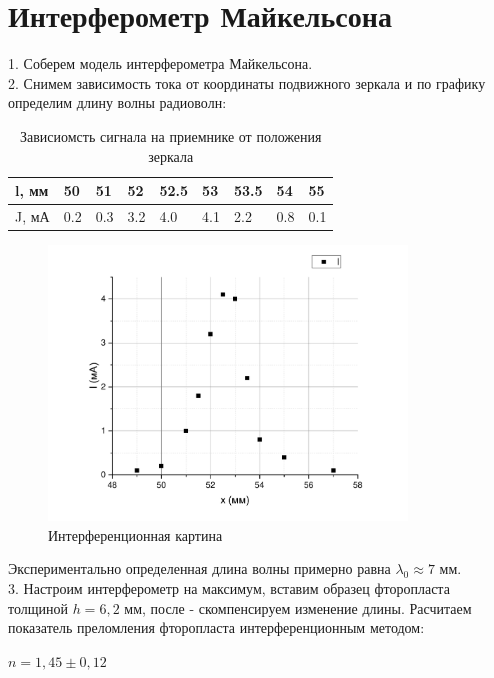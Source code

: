 \documentclass[12pt]{article}
\begin{document}
\section{Интерферометр Майкельсона}
1. Соберем модель интерферометра Майкельсона.\\
2. Снимем зависимость тока от координаты подвижного зеркала и по графику определим длину волны радиоволн:\\
\begin{table}[!h]
\caption{Зависиомсть сигнала на приемнике от положения зеркала}
\begin{center}

\begin{tabular}{|l|l|l|l|l|l|l|l|l|}
\hline
l, мм  & 50 & 51 & 52 & 52.5 & 53 & 53.5 & 54 & 55 \\ \hline
J, мА & 0.2 & 0.3 & 3.2 & 4.0 & 4.1 & 2.2 & 0.8 & 0.1 \\ \hline

\end{tabular}

\end{center}
\end{table}
\begin{figure}[!h]
\begin{center}
\includegraphics[width = 0.85\textwidth]{interf}
\caption{Интерференционная картина}
\end{center}
\end{figure}
Экспериментально определенная длина волны примерно равна $\lambda_0 \approx 7$ мм.\\
3. Настроим интерферометр на максимум, вставим образец фторопласта толщиной $h = 6,2$ мм, после - скомпенсируем изменение длины. Расчитаем показатель преломления фторопласта интерференционным методом:\\
\begin{center}
$n = 1,45 \pm 0,12$
\end{center} 
\end{document}
